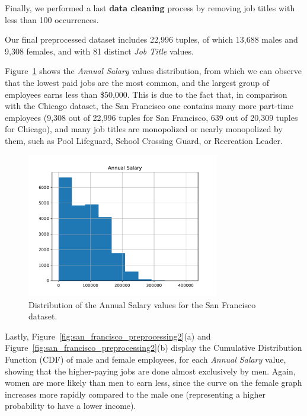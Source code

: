 Finally, we performed a last \textbf{data cleaning} process by removing job titles with less than 100 occurrences.

Our final preprocessed dataset includes 22,996 tuples, of which 13,688 males and 9,308 females, and with 81 distinct \textit{Job Title} values.

Figure~\ref{fig:san_francisco_preprocessing1} shows the \textit{Annual Salary} values distribution, from which we can observe that the lowest paid jobs are the most common, and the largest group of employees earns less than \$50,000. This is due to the fact that, in comparison with the Chicago dataset, the San Francisco one contains many more part-time employees (9,308 out of 22,996 tuples for San Francisco, 639 out of 20,309 tuples for Chicago), and many job titles are monopolized or nearly monopolized by them, such as Pool Lifeguard, School Crossing Guard, or Recreation Leader.

\begin{figure}[t!]
\centering
\includegraphics[width=0.75\textwidth]{figures/san_francisco_annual_salary_distribution.pdf}
\caption{Distribution of the \textrm{Annual Salary} values for the San Francisco dataset.}
\label{fig:san_francisco_preprocessing1}
\end{figure}

Lastly, Figure~\ref{fig:san_francisco_preprocessing2}(a) and Figure~\ref{fig:san_francisco_preprocessing2}(b) display the Cumulative Distribution Function (CDF) of male and female employees, for each \textit{Annual Salary} value, showing that the higher-paying jobs are done almost exclusively by men. Again, women are more likely than men to earn less, since the curve on the female graph increases more rapidly compared to the male one (representing a higher probability to have a lower income).

